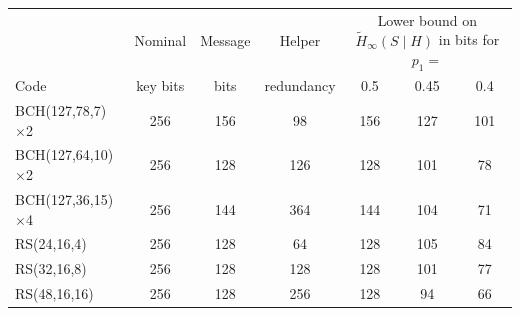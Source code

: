 \begin{tabular}{lcccccc}
\toprule
 & Nominal & Message & Helper & \multicolumn{3}{c}{Lower bound on $\tilde{H}_\infty(S\mid H)$ in bits for $p_1=$} \\
Code & key bits & bits & redundancy & 0.5 & 0.45 & 0.4 \\
\midrule
BCH(127,78,7) $\times$2 & 256 & 156 & 98 & 156 & 127 & 101 \\
BCH(127,64,10) $\times$2 & 256 & 128 & 126 & 128 & 101 & 78 \\
BCH(127,36,15) $\times$4 & 256 & 144 & 364 & 144 & 104 & 71 \\
RS(24,16,4) & 256 & 128 & 64 & 128 & 105 & 84 \\
RS(32,16,8) & 256 & 128 & 128 & 128 & 101 & 77 \\
RS(48,16,16) & 256 & 128 & 256 & 128 & 94 & 66 \\
\bottomrule
\end{tabular}
